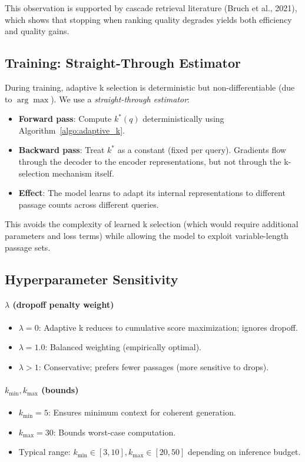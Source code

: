 This observation is supported by cascade retrieval literature (Bruch et al., 2021), which shows that stopping when ranking quality degrades yields both efficiency and quality gains.

\subsection*{Training: Straight-Through Estimator}

During training, adaptive k selection is deterministic but non-differentiable (due to $\arg\max$). We use a \emph{straight-through estimator}:

\begin{itemize}
\item \textbf{Forward pass}: Compute $k^*(q)$ deterministically using Algorithm~\ref{algo:adaptive_k}.
\item \textbf{Backward pass}: Treat $k^*$ as a constant (fixed per query). Gradients flow through the decoder to the encoder representations, but not through the k-selection mechanism itself.
\item \textbf{Effect}: The model learns to adapt its internal representations to different passage counts across different queries.
\end{itemize}

This avoids the complexity of learned k selection (which would require additional parameters and loss terms) while allowing the model to exploit variable-length passage sets.

\subsection*{Hyperparameter Sensitivity}

\paragraph{$\lambda$ (dropoff penalty weight)}
\begin{itemize}
\item $\lambda = 0$: Adaptive k reduces to cumulative score maximization; ignores dropoff.
\item $\lambda = 1.0$: Balanced weighting (empirically optimal).
\item $\lambda > 1$: Conservative; prefers fewer passages (more sensitive to drops).
\end{itemize}

\paragraph{$k_{\min}, k_{\max}$ (bounds)}
\begin{itemize}
\item $k_{\min} = 5$: Ensures minimum context for coherent generation.
\item $k_{\max} = 30$: Bounds worst-case computation.
\item Typical range: $k_{\min} \in [3, 10], k_{\max} \in [20, 50]$ depending on inference budget.
\end{itemize}

